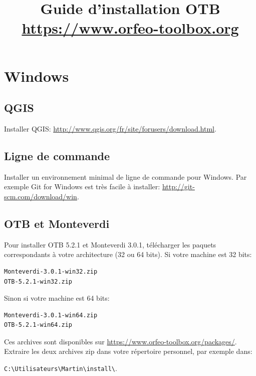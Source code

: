 \documentclass[10pt,a4paper]{article}
\title{Guide d'installation OTB\\
  {\small\url{https://www.orfeo-toolbox.org}}
}
\begin{document}
\maketitle

\section{Windows}

\subsection{QGIS}
Installer QGIS: \url{http://www.qgis.org/fr/site/forusers/download.html}.
\subsection{Ligne de commande}
Installer un environnement minimal de ligne de commande pour Windows. Par exemple
Git for Windows est très facile à installer:
\url{http://git-scm.com/download/win}.

\subsection{OTB et Monteverdi}
Pour installer OTB 5.2.1 et Monteverdi 3.0.1, télécharger les paquets
correspondants à votre architecture (32 ou 64 bits). Si votre machine est 32
bits:

\begin{verbatim}
Monteverdi-3.0.1-win32.zip
OTB-5.2.1-win32.zip
\end{verbatim}

Sinon si votre machine est 64 bits:

\begin{verbatim}
Monteverdi-3.0.1-win64.zip
OTB-5.2.1-win64.zip
\end{verbatim}

Ces archives sont disponibles sur \url{https://www.orfeo-toolbox.org/packages/}.
Extraire les deux archives zip dans votre répertoire personnel, par exemple dans:\\
\begin{centering}
\texttt{C:{\textbackslash}Utilisateurs{\textbackslash}Martin{\textbackslash}install{\textbackslash}}.
\end{centering}
\end{document}
